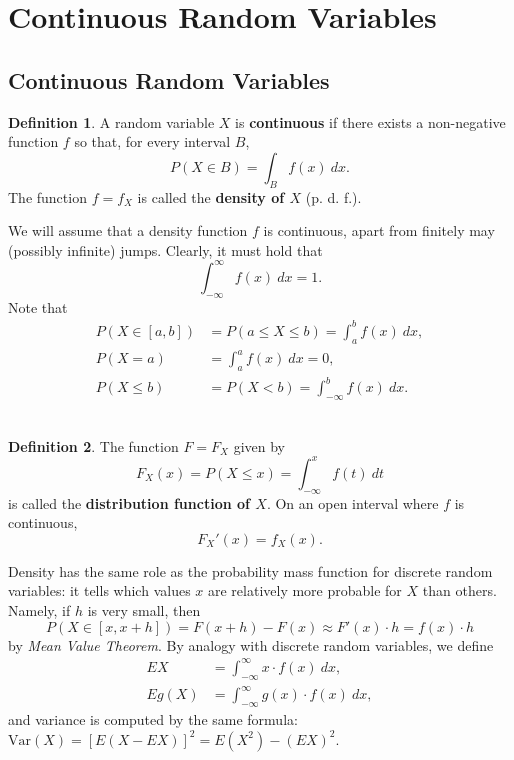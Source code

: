 \documentclass[12pt,a4paper]{article}
\theoremstyle{definition}
\theoremstyle{definition}
\newtheorem*{definition}{Definition}
\theoremstyle{definition}
\theoremstyle{definition}
\theoremstyle{remark}
\theoremstyle{definition}
\newcommand{\Var}{\text{Var}}
\begin{document}
\newpage
\section{Continuous Random Variables}
\subsection{Continuous Random Variables}
\begin{tcolorbox}[colback=white]
	\begin{definition}
		A random variable $X$ is \textbf{continuous} if there exists a non-negative function $f$ so that, for every interval $B$, \[
		P(X\in B)=\int_B f(x)\ dx.
		\] The function $f=f_X$ is called the \textbf{density of $X$} (p. d. f.).
	\end{definition}
\end{tcolorbox} We will assume that a density function $f$ is continuous, apart from finitely may (possibly infinite) jumps. Clearly, it must hold that \[
\int_{-\infty}^{\infty}f(x)\ dx=1.
\] Note that \begin{align*}
P(X\in[a,b])&=P(a\leq X\leq b)=\int_{a}^{b}f(x)\ dx,\\
P(X=a)&=\int_{a}^af(x)\ dx=0,\\
P(X\leq b)&=P(X<b)=\int_{-\infty}^{b}f(x)\ dx.
\end{align*}
\
\begin{tcolorbox}[colback=white]
	\begin{definition}
		The function $F=F_X$ given by \[
		F_X(x)=P(X\leq x)=\int_{-\infty}^xf(t)\ dt
		\] is called the \textbf{distribution function of $X$}. On an open interval where $f$ is continuous, \[
		F_X'(x)=f_X(x).
		\]
	\end{definition}
\end{tcolorbox} Density has the same role as the probability mass function for discrete random variables: it tells which values $x$ are relatively more probable for $X$ than others. Namely, if $h$ is very small, then \[
P(X\in[x,x+h])=F(x+h)-F(x)\approx F'(x)\cdot h=f(x)\cdot h
\] by \textit{Mean Value Theorem}. By analogy with discrete random variables, we define \begin{align*}
EX&=\int_{-\infty}^\infty x\cdot f(x)\ dx,\\
Eg(X)&=\int_{-\infty}^\infty g(x)\cdot f(x)\ dx,
\end{align*} and variance is computed by the same formula: $\Var(X)=[E(X-EX)]^2=E(X^2)-(EX)^2$.
\\
\end{document}
